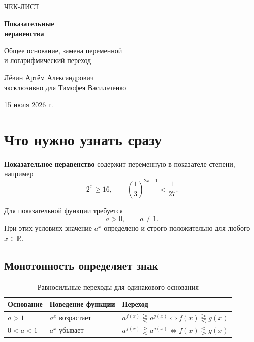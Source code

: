 \documentclass[a4paper,12pt]{article}
\renewcommand{\today}{15 июля 2026 г.}
\newcommand{\key}[1]{\textcolor{accent}{\textbf{#1}}}
\newcommand{\R}{\mathbb{R}}
\begin{document}
\begin{titlepage}
  \centering
  \vspace*{24mm}
  {\Large\textcolor{accent}{ЧЕК-ЛИСТ}\par}
  \vspace{8mm}
  {\fontsize{30}{36}\selectfont\bfseries Показательные\\[2mm] неравенства\par}
  \vspace{8mm}
  {\large Общее основание, замена переменной\\и логарифмический переход\par}
  \vfill
  {\large Лёвин Артём Александрович\\эксклюзивно для Тимофея Васильченко\par}
  \vspace{8mm}
  {\large \today\par}
  \vfill
\end{titlepage}

\tableofcontents
\thispagestyle{fancy}
\newpage

\section{Что нужно узнать сразу}

\key{Показательное неравенство} содержит переменную в показателе степени, например
\[
2^x\ge 16,\qquad
\left(\frac13\right)^{2x-1}<\frac1{27}.
\]

Для показательной функции требуется
\[
a>0,\qquad a\ne1.
\]
При этих условиях значение $a^x$ определено и строго положительно для любого $x\in\R$.

\subsection{Монотонность определяет знак}

\begin{table}[ht]
\centering
\caption{Равносильные переходы для одинакового основания}
\begin{tabularx}{\linewidth}{>{\bfseries}p{35mm} X X}
\toprule
Основание & Поведение функции & Переход \\
\midrule
$a>1$ & $a^x$ возрастает & $a^{f(x)}\gtreqless a^{g(x)}\iff f(x)\gtreqless g(x)$ \\
$0<a<1$ & $a^x$ убывает & $a^{f(x)}\gtreqless a^{g(x)}\iff f(x)\lesseqgtr g(x)$ \\
\bottomrule
\end{tabularx}
\end{table}
\end{document}
